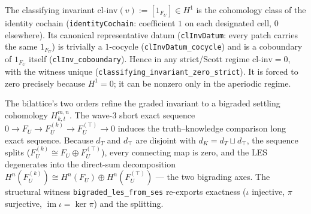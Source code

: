 \begin{theorem}\label{thm:classifying-invariant-zero-strict}\leanok{}
The classifying invariant $\mathrm{cl\text{-}inv}(v) := [1_{F_U}] \in H^1$ is the cohomology class of the identity cochain (\texttt{identityCochain}: coefficient $1$ on each designated cell, $0$ elsewhere). Its canonical representative datum (\texttt{clInvDatum}: every patch carries the same $1_{F_U}$) is trivially a $1$-cocycle (\texttt{clInvDatum\_cocycle}) and is a coboundary of $1_{F_U}$ itself (\texttt{clInv\_coboundary}). Hence in any strict/Scott regime $\mathrm{cl\text{-}inv} = 0$, with the witness unique (\texttt{classifying\_invariant\_zero\_strict}). It is forced to zero precisely because $H^1 = 0$; it can be nonzero only in the aperiodic regime.
\end{theorem}
\begin{remark}\label{rem:bigraded-les-ses}\leanok{}
The bilattice's two orders refine the graded invariant to a bigraded settling cohomology $H^{m,n}_{k,t}$. The wave-3 short exact sequence $0 \to F_U \to F_U^{(k)} \to F_U^{(\top)} \to 0$ induces the truth--knowledge comparison long exact sequence. Because $d_T$ and $d_\top$ are disjoint with $d_K = d_T \sqcup d_\top$, the sequence splits ($F_U^{(k)} \cong F_U \oplus F_U^{(\top)}$), every connecting map is zero, and the LES degenerates into the direct-sum decomposition $H^n(F_U^{(k)}) \cong H^n(F_U) \oplus H^n(F_U^{(\top)})$ --- the two bigrading axes. The structural witness \texttt{bigraded\_les\_from\_ses} re-exports exactness ($\iota$ injective, $\pi$ surjective, $\operatorname{im}\iota = \ker\pi$) and the splitting.
\end{remark}
